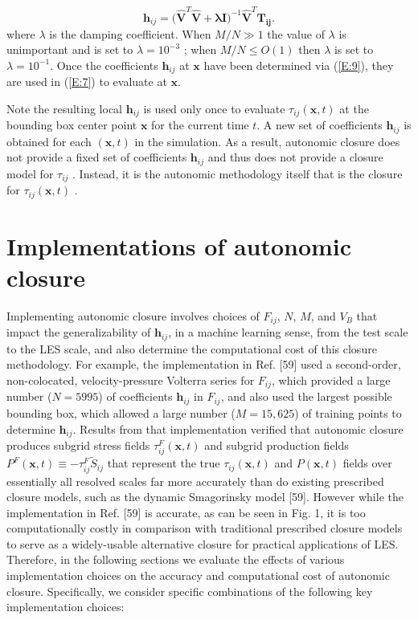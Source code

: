 %
\begin{equation}
	\label{E:9}
	\mathbf{h}_{ij} 
	= \bigg( \mathbf{\widehat{V}}^T \mathbf{\widehat{V}} + \mathbf{\lambda I} \bigg)^{-1} 
	\mathbf{\widehat{V}}^T \mathbf{T_{ij}}.
\end{equation}
%
%      
where  $\lambda$ is the damping coefficient. When $M/N \gg 1$  the value of  $\lambda$ is unimportant and is set to $\lambda = 10^{-3}$ ; when $M/N \leq O(1)$  then $\lambda$   is set to $\lambda = 10^{-1}$. Once the coefficients $\mathbf{h}_{ij}$  at $\mathbf{x}$ have been determined via (\ref{E:9}), they are used in (\ref{E:7}) to evaluate   at $\mathbf{x}$. 

Note the resulting local $\mathbf{h}_{ij}$   is used only once to evaluate $\tau_{ij}(\mathbf{x},t)$   at the bounding box center point $\mathbf{x}$ for the current time $t$. A new set of coefficients  $\mathbf{h}_{ij}$ is obtained for each $(\mathbf{x},t)$  in the simulation. As a result, autonomic closure does not provide a fixed set of coefficients $\mathbf{h}_{ij}$  and thus does not provide a closure model for $\tau_{ij}$ . Instead, it is the autonomic methodology itself that is the closure for $\tau_{ij}(\mathbf{x},t)$  .

\section{Implementations of autonomic closure }

Implementing autonomic closure involves choices of $F_{ij}$, $N$, $M$, and $V_B$ that impact the generalizability of $\mathbf{h}_{ij}$, in a machine learning sense, from the test scale to the LES scale, and also determine the computational cost of this closure methodology. For example, the implementation in Ref. [59] used a second-order, non-colocated, velocity-pressure Volterra series for $F_{ij}$, which provided a large number ($N = 5995$) of coefficients $\mathbf{h}_{ij}$  in $F_{ij}$, and also used the largest possible bounding box, which allowed a large number ($M  = 15,625$) of training points to determine $\mathbf{h}_{ij}$. Results from that implementation verified that autonomic closure produces subgrid stress fields $\tau_{ij}^{F}(\mathbf{x},t)$   and subgrid production fields  $P^{F}(\mathbf{x},t) \equiv -\tau_{ij}^{F}\widetilde{S}_{ij}$ that represent the true $\tau_{ij}(\mathbf{x},t)$  and  $P(\mathbf{x},t)$   fields over essentially all resolved scales far more accurately than do existing prescribed closure models, such as the dynamic Smagorinsky model [59]. 
However while the implementation in Ref. [59] is accurate, as can be seen in Fig. 1, it is too computationally costly in comparison with traditional prescribed closure models to serve as a widely-usable alternative closure for practical applications of LES. Therefore, in the following sections we evaluate the effects of various implementation choices on the accuracy and computational cost of autonomic closure. Specifically, we consider specific combinations of the following key implementation choices: 

